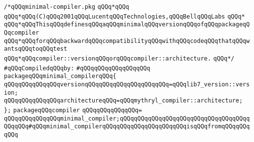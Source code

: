 \label{src/lib/core/compiler/minimal-compiler.pkg}
\verb|/*qQQqminimal-compiler.pkg|\newline
\verb|qQQq*qQQq|\newline
\verb|qQQq*qQQq(C)qQQq2001qQQqLucentqQQqTechnologies,qQQqBellqQQqLabs|\newline
\verb|qQQq*|\newline
\verb|qQQq*qQQqThisqQQqdefinesqQQqaqQQqminimalqQQqversionqQQqofqQQqpackageqQQqcompiler|\newline
\verb|qQQq*qQQqforqQQqbackwardqQQqcompatibilityqQQqwithqQQqcodeqQQqthatqQQqwantsqQQqtoqQQqtest|\newline
\verb|qQQq*qQQqcompiler::versionqQQqorqQQqcompiler::architecture.|\newline
\verb|qQQq*/|\newline
\newline
\verb|#qQQqCompiledqQQqby:|\newline
\verb|#qQQqqQQqqQQqqQQqqQQq|\newline
\newline
\newline
\newline
\verb|packageqQQqminimal_compilerqQQq{|\newline
\newline
\verb|qQQqqQQqqQQqqQQqversionqQQqqQQqqQQqqQQqqQQqqQQq=qQQqlib7_version::version;|\newline
\verb|qQQqqQQqqQQqqQQqarchitectureqQQq=qQQqmythryl_compiler::architecture;|\newline
\verb|};|\newline
\newline
\verb|packageqQQqcompiler|\newline
\verb|qQQqqQQqqQQqqQQq=|\newline
\verb|qQQqqQQqqQQqqQQqminimal_compiler;qQQqqQQqqQQqqQQqqQQqqQQqqQQqqQQqqQQqqQQqqQQq#qQQqminimal_compilerqQQqqQQqqQQqqQQqqQQqqQQqisqQQqfromqQQqqQQqqQQq|\newline

